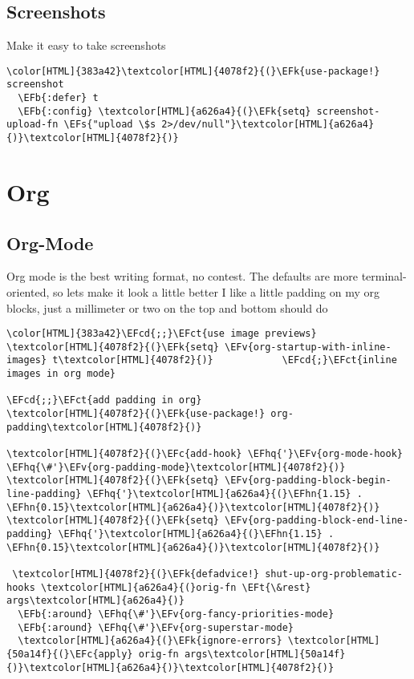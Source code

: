 \documentclass{scrartcl}
\newcommand{\EFk}[1]{\textcolor{EFk}{#1}} %
\newcommand{\EFt}[1]{\textcolor{EFt}{#1}} %
\newcommand{\EFs}[1]{\textcolor{EFs}{#1}} %
\newcommand{\EFb}[1]{\textcolor{EFb}{#1}} %
\newcommand{\EFct}[1]{\textcolor{EFct}{#1}} %
\newcommand{\EFc}[1]{\textcolor{EFc}{#1}} %
\newcommand{\EFv}[1]{\textcolor{EFv}{#1}} %
\newcommand{\EFcd}[1]{\textcolor{EFcd}{#1}} %
\newcommand{\EFhn}[1]{\textcolor{EFhn}{\textbf{#1}}} %
\newcommand{\EFhq}[1]{\textcolor{EFhq}{#1}} %
\begin{document}
\subsection{Screenshots}
\label{sec:org1ecd317}
Make it easy to take screenshots
\begin{Code}
\begin{Verbatim}[]
\color[HTML]{383a42}\textcolor[HTML]{4078f2}{(}\EFk{use-package!} screenshot
  \EFb{:defer} t
  \EFb{:config} \textcolor[HTML]{a626a4}{(}\EFk{setq} screenshot-upload-fn \EFs{"upload \$s 2>/dev/null"}\textcolor[HTML]{a626a4}{)}\textcolor[HTML]{4078f2}{)}
\end{Verbatim}
\end{Code}

\section{Org}
\label{sec:org5a87c6a}
\subsection{Org-Mode}
\label{sec:org1695371}
Org mode is the best writing format, no contest. The defaults are more terminal-oriented, so lets make it look a little better
I like a little padding on my org blocks, just a millimeter or two on the top and bottom should do
\begin{Code}
\begin{Verbatim}[]
\color[HTML]{383a42}\EFcd{;;}\EFct{use image previews}
\textcolor[HTML]{4078f2}{(}\EFk{setq} \EFv{org-startup-with-inline-images} t\textcolor[HTML]{4078f2}{)}            \EFcd{;}\EFct{inline images in org mode}

\EFcd{;;}\EFct{add padding in org}
\textcolor[HTML]{4078f2}{(}\EFk{use-package!} org-padding\textcolor[HTML]{4078f2}{)}

\textcolor[HTML]{4078f2}{(}\EFc{add-hook} \EFhq{'}\EFv{org-mode-hook} \EFhq{\#'}\EFv{org-padding-mode}\textcolor[HTML]{4078f2}{)}
\textcolor[HTML]{4078f2}{(}\EFk{setq} \EFv{org-padding-block-begin-line-padding} \EFhq{'}\textcolor[HTML]{a626a4}{(}\EFhn{1.15} . \EFhn{0.15}\textcolor[HTML]{a626a4}{)}\textcolor[HTML]{4078f2}{)}
\textcolor[HTML]{4078f2}{(}\EFk{setq} \EFv{org-padding-block-end-line-padding} \EFhq{'}\textcolor[HTML]{a626a4}{(}\EFhn{1.15} . \EFhn{0.15}\textcolor[HTML]{a626a4}{)}\textcolor[HTML]{4078f2}{)}

 \textcolor[HTML]{4078f2}{(}\EFk{defadvice!} shut-up-org-problematic-hooks \textcolor[HTML]{a626a4}{(}orig-fn \EFt{\&rest} args\textcolor[HTML]{a626a4}{)}
  \EFb{:around} \EFhq{\#'}\EFv{org-fancy-priorities-mode}
  \EFb{:around} \EFhq{\#'}\EFv{org-superstar-mode}
  \textcolor[HTML]{a626a4}{(}\EFk{ignore-errors} \textcolor[HTML]{50a14f}{(}\EFc{apply} orig-fn args\textcolor[HTML]{50a14f}{)}\textcolor[HTML]{a626a4}{)}\textcolor[HTML]{4078f2}{)}
\end{Verbatim}
\end{Code}
\end{document}
